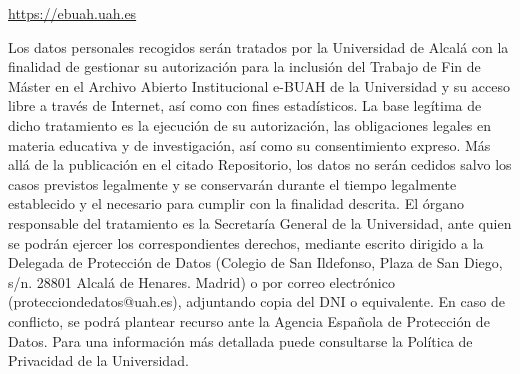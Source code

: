 \vspace{0.1cm}

{\footnotesize \url{https://ebuah.uah.es}}


\begin{spacing}{0.8}

{\footnotesize Los datos personales recogidos serán tratados por la Universidad de
Alcalá con la finalidad de gestionar su autorización para la inclusión
del Trabajo de Fin de Máster en el Archivo Abierto Institucional
e-BUAH de la Universidad y su acceso libre a través de Internet, así
como con fines estadísticos. La base legítima de dicho tratamiento es
la ejecución de su autorización, las obligaciones legales en materia
educativa y de investigación, así como su consentimiento expreso. Más
allá de la publicación en el citado Repositorio, los datos no serán
cedidos salvo los casos previstos legalmente y se conservarán durante
el tiempo legalmente establecido y el necesario para cumplir con la
finalidad descrita. El órgano responsable del tratamiento es la
Secretaría General de la Universidad, ante quien se podrán ejercer los
correspondientes derechos, mediante escrito dirigido a la Delegada de
Protección de Datos (Colegio de San Ildefonso, Plaza de San Diego,
s/n. 28801 Alcalá de Henares. Madrid) o por correo electrónico
(protecciondedatos@uah.es), adjuntando copia del DNI o equivalente. En
caso de conflicto, se podrá plantear recurso ante la Agencia Española
de Protección de Datos. Para una información más detallada puede
consultarse la Política de Privacidad de la Universidad.}

\end{spacing}




% 




